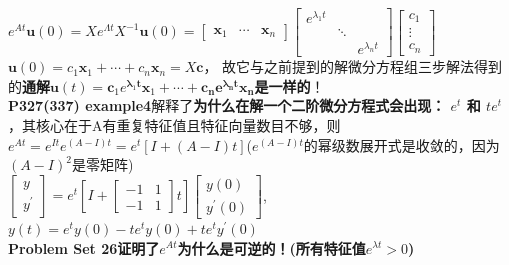 \documentclass[UTF8]{article}
\begin{document}
    $e^{A t} \bm{u}(0)=X e^{\Lambda t} X^{-1} \bm{u}(0)=\left[\begin{array}{ccc}{\bm{x}_{1}} & {\cdots} & {\bm{x}_{n}}\end{array}\right]\left[\begin{array}{ccc}{e^{\lambda_{1} t}} & {} & {} \\ {} & {\ddots} & {} \\ {} & {} & {e^{\lambda_{n} t}}\end{array}\right]\left[\begin{array}{c}{c_{1}} \\ {\vdots} \\ {c_{n}}\end{array}\right]$
    \\
    $\boldsymbol{u}(0)=c_{1} \boldsymbol{x}_{1}+\cdots+c_{n} \boldsymbol{x}_{n}=X \boldsymbol{c}$，\quad
    故它与之前提到的解微分方程组三步解法得到的\textbf{通解}$\boldsymbol{u}(t)=\boldsymbol{c}_{1} e^{\boldsymbol{\lambda}_{1} \boldsymbol{t}} \boldsymbol{x}_{1}+\cdots+\boldsymbol{c}_{\boldsymbol{n}} \boldsymbol{e}^{\boldsymbol{\lambda}_{\boldsymbol{n}} \boldsymbol{t}} \boldsymbol{x}_{\boldsymbol{n}}$\textbf{是一样的}！
    \\
    \textbf{{P327(337) example4}}解释了\textbf{为什么在解一个二阶微分方程式会出现： $e^{t}$ 和 $t e^{t}$}，其核心在于A有重复特征值且特征向量数目不够，则$e^{A t}=e^{I t} e^{(A-I) t}=e^{t}[I+(A-I) t]$($e^{(A-I) t}$的幂级数展开式是收敛的，因为$(A-I)^{2}$是零矩阵)\\
    $\left[\begin{array}{l}{y} \\ {y^{\prime}}\end{array}\right]=e^{t}\left[I+\left[\begin{array}{cc}{-1} & {1} \\ {-1} & {1}\end{array}\right] t\right]\left[\begin{array}{c}{y(0)} \\ {y^{\prime}(0)}\end{array}\right]$, $y(t)=e^{t} y(0)-t e^{t} y(0)+t e^{t} y^{\prime}(0)$
    \\
    \textbf{Problem Set 26证明了$e^{At}$为什么是可逆的！(所有特征值$e^{\lambda t}>0$)}\\
\end{document}
